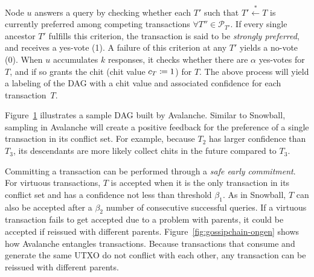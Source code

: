 Node $u$ answers a query by checking whether each $T'$ such that $T' \stackrel{*}{\gets} T$ is currently preferred among competing transactions $\forall T'' \in \mathcal{P}_{T'}$.
If every single ancestor $T'$ fulfills this criterion, the transaction is said to be \emph{strongly preferred}, and receives a yes-vote (1). A failure of this criterion at any $T'$ yields a no-vote (0).
When $u$ accumulates $k$ responses, it checks whether there are $\alpha$ yes-votes for $T$, and if so grants the chit (chit value $c_T \coloneqq 1$) for $T$.
The above process will yield a labeling of the DAG with a chit value and associated confidence for each transaction~$T$.

\begin{figure}
\begin{center}
    
    \label{fig:dag-cd}
\end{center}
\end{figure}

Figure~\ref{fig:dag-cd} illustrates a sample DAG built by Avalanche.
Similar to Snowball, sampling in Avalanche will create a positive feedback for the preference of a single transaction in its conflict set.
For example, because $T_2$ has larger confidence than $T_3$, its descendants are more likely collect chits in the future compared to $T_3$.


Committing a transaction can be performed through a \emph{safe early commitment}. For virtuous transactions, $T$ is accepted when it is the only transaction in its conflict set and has a confidence not less than threshold $\beta_1$.
As in Snowball, $T$ can also be accepted after a $\beta_2$ number of consecutive successful queries.
If a virtuous transaction fails to get accepted due to a problem
with parents, it could be accepted if reissued with different parents.
Figure~\ref{fig:gossipchain-ongen} shows how Avalanche entangles transactions. Because transactions that consume and generate the same UTXO do not conflict with each other, any transaction can be reissued with different parents.

